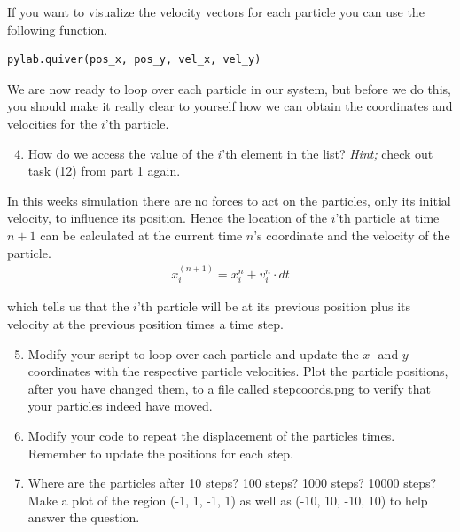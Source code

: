 \documentclass{article}
\begin{document}
If you want to visualize the velocity vectors for each particle you can
use the following function.\\

\begin{lstlisting}
pylab.quiver(pos_x, pos_y, vel_x, vel_y)
\end{lstlisting}

We are now ready to loop over each particle in our system, but before we do
this, you should make it really clear to yourself how we can obtain the
coordinates and velocities for the $i$'th particle.

\begin{enumerate}
  \setcounter{enumi}{3}
  \item How do we access the value of the $i$'th element in the  list?
      {\em Hint;} check out task (12) from part 1 again.

\end{enumerate}

In this weeks simulation there are no forces to act on the particles,
only its initial velocity, to influence its position.
Hence the location of the $i$'th particle at time $n+1$ can be
calculated at the current time $n$'s coordinate and the velocity of the
particle.
\begin{align}
  x_i^{(n+1)} = x^n_i + v_{i}^n \cdot dt
\end{align}

which tells us that the $i$'th particle will be at its previous position plus its
velocity at the previous position times a time step.

\begin{enumerate}
  \setcounter{enumi}{4}
  \item
    Modify your script to loop over each particle and update the $x$- and
    $y$-coordinates with the respective particle velocities.
    Plot the particle positions, after you have changed them,
    to a file called stepcoords.png to verify that your particles indeed have
    moved.

  \item Modify your code to repeat the displacement of the particles  times.
      Remember to update the positions for each step.

  \item Where are the particles after 10 steps? 100 steps? 1000 steps? 10000 steps?
    Make a plot of the region (-1, 1, -1, 1) as well as (-10, 10, -10, 10) to
    help answer the question.

\end{enumerate}
\end{document}
